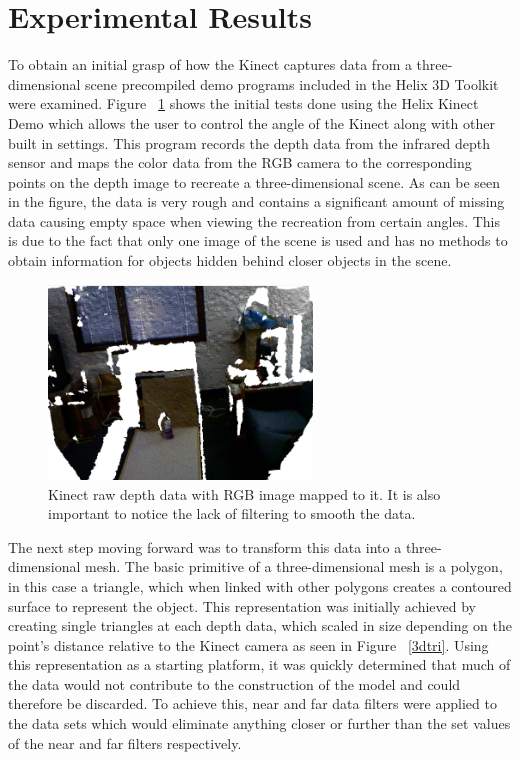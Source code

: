\documentclass[pdftex,10.5pt]{report}
\begin{document}
\section{Experimental Results}
To obtain an initial grasp of how the Kinect captures data from a three-dimensional scene precompiled demo programs included in the Helix 3D Toolkit were examined. \cite{helix} Figure ~\ref{waterbot}  shows the initial tests done using the Helix Kinect Demo which allows the user to control the angle of the Kinect along with other built in settings. This program records the depth data from the infrared depth sensor and maps the color data from the RGB camera to the corresponding points on the depth image to recreate a three-dimensional scene. As can be seen in the figure, the data is very rough and contains a significant amount of missing data causing empty space when viewing the recreation from certain angles. This is due to the fact that only one image of the scene is used and has no methods to obtain information for objects hidden behind closer objects in the scene.

\begin{figure}[H]
	\centering
	\includegraphics[width=70mm]{figures/kinectwaterbottle.png}
	\caption{Kinect raw depth data with RGB image mapped to it. It is also important to notice the lack of filtering to smooth the data.}
	\label{waterbot}
\end{figure}

The next step moving forward was to transform this data into a three-dimensional mesh. The basic primitive of a three-dimensional mesh is a polygon, in this case a triangle, which when linked with other polygons creates a contoured surface to represent the object. This representation was initially achieved by creating single triangles at each depth data, which scaled in size depending on the point's distance relative to the Kinect camera as seen in Figure ~\ref{3dtri}. Using this representation as a starting platform, it was quickly determined that much of the data would not contribute to the construction of the model and could therefore be discarded. To achieve this, near and far data filters were applied to the data sets which would eliminate anything closer or further than the set values of the near and far filters respectively.
\end{document}
